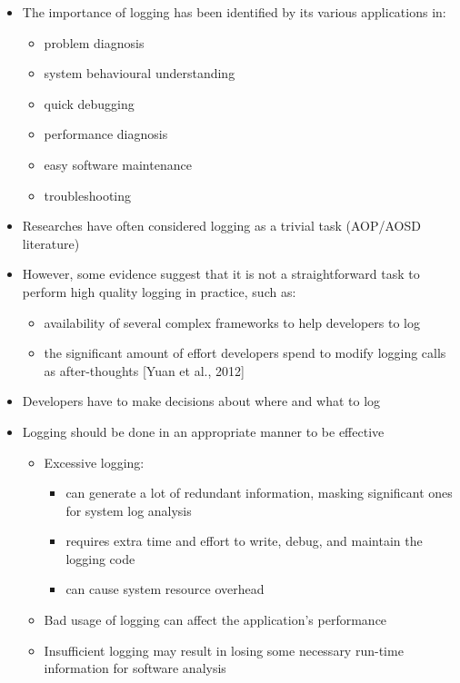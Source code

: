 \begin{itemize} [leftmargin=.01in]
\item The importance of logging has been identified by its various applications in:
\begin{itemize} [leftmargin=.3in]
\item problem diagnosis
\item system behavioural understanding
\item quick debugging
\item performance diagnosis
\item easy software maintenance 
\item troubleshooting
\end{itemize}
\item Researches have often considered logging as a trivial task (AOP/AOSD literature) %
\item However, some evidence suggest that it is not a straightforward task to perform high quality logging in practice, such as:
\begin{itemize} [leftmargin=.3in]
\item availability of several complex frameworks to help developers to log  
\item the significant amount of effort developers spend to modify logging calls as after-thoughts [Yuan et al., 2012]
\end{itemize}
\item Developers have to make decisions about where and what to log
\item Logging should be done in an appropriate manner to be effective
\begin{itemize} [leftmargin=.3in]
\item Excessive logging:
\begin{itemize} [leftmargin=.3in]
\item can generate a lot of redundant information, masking significant ones for system log analysis
\item requires extra time and effort to write, debug, and maintain the logging code
\item can cause system resource overhead
\end{itemize}
\item Bad usage of logging can affect the application's performance
\item Insufficient logging may result in losing some necessary run-time information for software analysis
\end{itemize}


\end{itemize}
